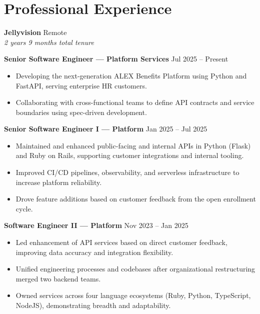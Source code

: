 \documentclass[11pt,letterpaper]{article}
\begin{document}
                \section{Professional Experience}

                \textbf{\large Jellyvision} \hfill Remote \\
                \textit{2 years 9 months total tenure}

                \vspace{4pt}
                \textbf{Senior Software Engineer --- Platform Services} \hfill Jul 2025 -- Present
                \begin{itemize}
                    \item Developing the next-generation ALEX Benefits Platform using Python and FastAPI, serving enterprise HR customers.
                        \item Collaborating with cross-functional teams to define API contracts and service boundaries using spec-driven development.
                        \end{itemize}

                        \vspace{4pt}
                        \textbf{Senior Software Engineer I --- Platform} \hfill Jan 2025 -- Jul 2025
                        \begin{itemize}
                            \item Maintained and enhanced public-facing and internal APIs in Python (Flask) and Ruby on Rails, supporting customer integrations and internal tooling.
                                \item Improved CI/CD pipelines, observability, and serverless infrastructure to increase platform reliability.
                                    \item Drove feature additions based on customer feedback from the open enrollment cycle.
                                    \end{itemize}

                                    \vspace{4pt}
                                    \textbf{Software Engineer II --- Platform} \hfill Nov 2023 -- Jan 2025
                                    \begin{itemize}
                                        \item Led enhancement of API services based on direct customer feedback, improving data accuracy and integration flexibility.
                                            \item Unified engineering processes and codebases after organizational restructuring merged two backend teams.
                                                \item Owned services across four language ecosystems (Ruby, Python, TypeScript, NodeJS), demonstrating breadth and adaptability.
                                                \end{itemize}
\end{document}

